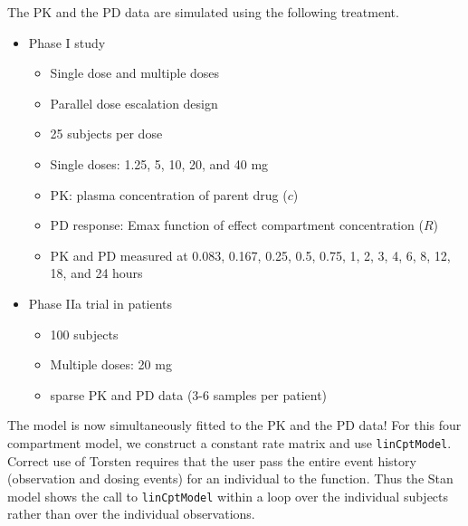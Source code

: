 \documentclass[11pt]{amsart}
\begin{document}
The PK and the PD data are simulated using the following treatment.
\begin{itemize}
  \item Phase I study
  \begin{itemize}
    \item Single dose and multiple doses
    \item Parallel dose escalation design
    \item 25 subjects per dose
    \item Single doses: 1.25, 5, 10, 20, and 40 mg 
    \item PK: plasma concentration of parent drug ($c$)
    \item PD response: Emax function of effect compartment concentration ($R$)
    \item PK and PD measured at 0.083, 0.167, 0.25, 0.5, 0.75, 1, 2, 3, 4, 6, 8, 12, 18, and 24 hours
  \end{itemize}
  \item Phase IIa trial in patients
  \begin{itemize}
    \item 100 subjects
    \item Multiple doses: 20 mg
    \item sparse PK and PD data (3-6 samples per patient)
  \end{itemize}
\end{itemize}

The model is now simultaneously fitted to the PK and the PD data! For this four compartment model, we construct a constant rate matrix and use \texttt{linCptModel}. Correct use of Torsten requires that the user pass the entire event history (observation and dosing events) for an individual to the function. Thus the Stan model shows the call to \texttt{linCptModel} within a loop over the individual subjects rather than over the individual observations.
\end{document}
